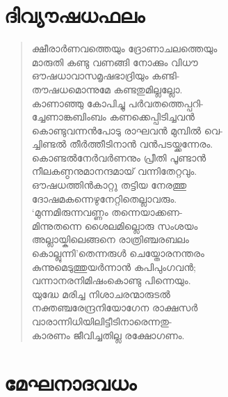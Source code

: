 
\section{ദിവ്യൗഷധഫലം}

\begin{verse}
ക്ഷീരാര്‍ണവത്തെയും ദ്രോണാചലത്തെയും\\
മാരുതി കണ്ടു വണങ്ങി നോക്കും വിധൗ\\
ഔഷധാവാസമൃഷഭാദ്രിയും കണ്ടി-\\
തൗഷധമൊന്നുമേ കണ്ടതുമില്ലല്ലോ.\\
കാണാഞ്ഞു കോപിച്ചു പര്‍വതത്തെപ്പറി-\\
ച്ചേണാങ്കബിംബം കണക്കെപ്പിടിച്ചവന്‍\\
കൊണ്ടുവന്നന്‍പോടു രാഘവന്‍ മുമ്പില്‍ വെ-\\
ച്ചിണ്ടല്‍ തീര്‍ത്തീടിനാന്‍ വന്‍പടയ്ക്കന്നേരം.\\
കൊണ്ടല്‍നേര്‍വര്‍ണനും പ്രീതി പൂണ്ടാന്‍\\
നീലകണ്ഠനുമാനന്ദമായ് വന്നിതേറ്റവും.\\
ഔഷധത്തിന്‍കാറ്റു തട്ടിയ നേരത്തു\\
ദോഷമകന്നെഴുനേറ്റിതെല്ലാവരും.\\
‘മുന്നമിരുന്നവണ്ണം തന്നെയാക്കണ-\\
മിന്നുതന്നെ ശൈലമില്ലൊരു സംശയം\\
അല്ലായ്കിലെങ്ങനെ രാത്രിഞ്ചരബലം\\
കൊല്ലുന്നി’തെന്നരുള്‍ ചെയ്തോരനന്തരം\\
കുന്നുമെടുത്തുയര്‍ന്നാന്‍ കപിപുംഗവന്‍;\\
വന്നാനരനിമിഷംകൊണ്ടു പിന്നെയും.\\
യുദ്ധേ മരിച്ച നിശാചരന്മാരുടല്‍\\
നക്തഞ്ചരേന്ദ്രനിയോഗേന രാക്ഷസര്‍\\
വാരാന്നിധിയിലിട്ടീടിനാരെന്നതു-\\
കാരണം ജീവിച്ചതില്ല രക്ഷോഗണം.
\end{verse}


\section{മേഘനാദവധം}

